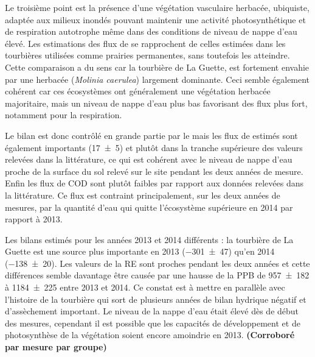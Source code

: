 Le troisième point est la présence d'une végétation vasculaire herbacée, ubiquiste, adaptée aux milieux inondés pouvant maintenir une activité photosynthétique et de respiration autotrophe même dans des conditions de niveau de nappe d'eau élevé.
Les estimations des flux de \coo se rapprochent de celles estimées dans les tourbières utilisées comme prairies permanentes, sans toutefois les atteindre.
Cette comparaison a du sens car la tourbière de La Guette, est fortement envahie par une herbacée (\textit{Molinia caerulea}) largement dominante.
Ceci semble également cohérent car ces écosystèmes ont généralement une végétation herbacée majoritaire, mais un niveau de nappe d'eau plus bas favorisant des flux plus fort, notamment pour la respiration.

Le bilan est donc contrôlé en grande partie par le \coo mais les flux de \chh estimés sont également importants (\SI{17(5)}{\gcma}) et plutôt dans la tranche supérieure des valeurs relevées dans la littérature, ce qui est cohérent avec le niveau de nappe d'eau proche de la surface du sol relevé sur le site pendant les deux années de mesure.
Enfin les flux de COD sont plutôt faibles par rapport aux données relevées dans la littérature.
Ce flux est contraint principalement, sur les deux années de mesures, par la quantité d'eau qui quitte l'écosystème supérieure en 2014 par rapport à 2013.

Les bilans estimés pour les années 2013 et 2014 différents : la tourbière de La Guette est une source plus importante en 2013 (\SI{-301(47)}{\gcma}) qu'en 2014 (\SI{-138(20)}{\gcma}).
Les valeurs de la RE sont proches pendant les deux années et cette différences semble davantage être causée par une hausse de la PPB de \num{957(182)} à \SI{1184(225)}{\gcma} entre 2013 et 2014.
Ce constat est à mettre en parallèle avec l'histoire de la tourbière qui sort de plusieurs années de bilan hydrique négatif et d'assèchement important.
Le niveau de la nappe d'eau était élevé dès de début des mesures, cependant il est possible que les capacités de développement et de photosynthèse de la végétation soient encore amoindrie en 2013.
\textbf{(Corroboré par mesure par groupe)}





